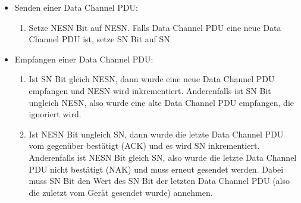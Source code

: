 \begin{itemize}
    \item Senden einer Data Channel PDU:
    \begin{enumerate}
        \item Setze NESN Bit auf NESN. Falls Data Channel PDU eine neue Data Channel PDU ist, setze SN Bit auf SN
    \end{enumerate}
    \item Empfangen einer Data Channel PDU:
    \begin{enumerate}
        \item Ist SN Bit gleich NESN, dann wurde eine neue Data Channel PDU empfangen und NESN wird inkrementiert. Anderenfalls ist SN Bit ungleich NESN, also wurde eine alte Data Channel PDU empfangen, die ignoriert wird.
        \item Ist NESN Bit ungleich SN, dann wurde die letzte Data Channel PDU vom gegenüber bestätigt (ACK) und es wird SN inkrementiert. Anderenfalls ist NESN Bit gleich SN, also wurde die letzte Data Channel PDU nicht bestätigt (NAK) und muss erneut gesendet werden. Dabei muss SN Bit den Wert des SN Bit der letzten Data Channel PDU (also die zuletzt vom Gerät gesendet wurde) annehmen.
    \end{enumerate}
\end{itemize}

